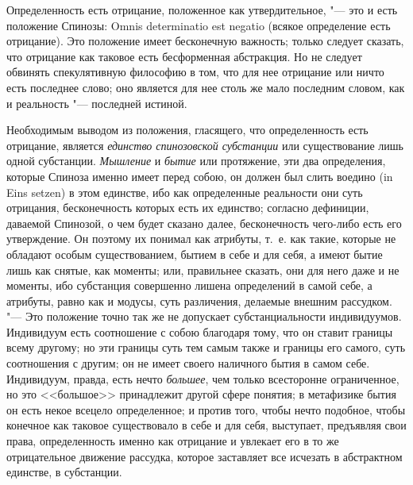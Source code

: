 Определенность есть отрицание, положенное как утвердительное, "--- это и есть
положение Спинозы: Omnis determinatio est negatio (всякое определение есть
отрицание). Это положение имеет
бесконечную важность; только следует сказать, что отрицание как таковое
есть бесформенная абстракция. Но не следует обвинять спекулятивную
философию в том, что для нее отрицание или ничто есть последнее слово; оно
является для нее столь же мало последним словом, как и реальность
"--- последней истиной.

Необходимым выводом из положения, гласящего, что определенность есть
отрицание, является {\em единство спинозовской
субстанции} или существование лишь одной субстанции.
{\em Мышление} и {\em бытие} или
протяжение, эти два определения, которые Спиноза именно имеет перед собою,
он должен был слить воедино (in Eins setzen) в этом единстве, ибо как
определенные реальности они суть отрицания, бесконечность которых есть их
единство; согласно дефиниции, даваемой Спинозой, о чем будет сказано далее,
бесконечность чего-либо есть его утверждение. Он поэтому их понимал как
атрибуты, т.~е. как такие, которые не обладают особым существованием,
бытием в себе и для себя, а имеют бытие лишь как снятые, как моменты; или,
правильнее сказать, они для него даже и не моменты, ибо субстанция
совершенно лишена определений в самой себе, а атрибуты, равно как и модусы,
суть различения, делаемые внешним рассудком. "--- Это положение точно так же
не допускает субстанциальности индивидуумов. Индивидуум есть соотношение с
собою благодаря тому, что он ставит границы всему другому; но эти границы
суть тем самым также и границы его самого, суть соотношения с другим; он не
имеет своего наличного бытия в самом себе. Индивидуум, правда, есть нечто
{\em большее}, чем только всесторонне ограниченное, но
это <<большое>> принадлежит другой сфере понятия; в метафизике бытия он есть
некое всецело определенное; и против того, чтобы нечто подобное, чтобы
конечное как таковое существовало в себе и для себя, выступает, предъявляя
свои права, определенность именно как отрицание и увлекает его в то же
отрицательное движение рассудка, которое заставляет все исчезать в
абстрактном единстве, в субстанции.


